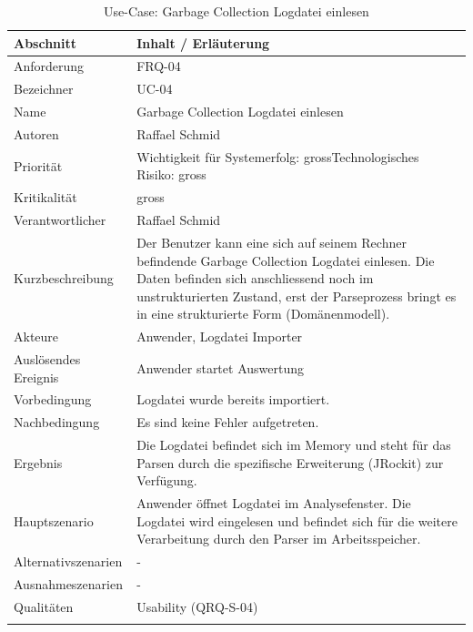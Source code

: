 \begin{longtable}{|p{4cm}|p{10.5cm}|}
\hline
   \textbf{Abschnitt} & \textbf{Inhalt / Erläuterung} \\\hline
   Anforderung & FRQ-04\\\hline
   Bezeichner & UC-04\\\hline
   Name & Garbage Collection Logdatei einlesen\\\hline
   Autoren & Raffael Schmid\\\hline
   Priorität & Wichtigkeit für Systemerfolg: gross\newline Technologisches Risiko: gross\\\hline
   Kritikalität & gross\\\hline
   Verantwortlicher & Raffael Schmid\\\hline
   Kurzbeschreibung & Der Benutzer kann eine sich auf seinem Rechner befindende Garbage Collection Logdatei einlesen. Die Daten befinden sich anschliessend noch im unstrukturierten Zustand, erst der Parseprozess bringt es in eine strukturierte Form (Domänenmodell).\\\hline
   Akteure & Anwender, Logdatei Importer\\\hline
   Auslösendes Ereignis & Anwender startet Auswertung\\\hline
   Vorbedingung & Logdatei wurde bereits importiert.\\\hline
   Nachbedingung & Es sind keine Fehler aufgetreten.\\\hline
   Ergebnis & Die Logdatei befindet sich im Memory und steht für das Parsen durch die spezifische Erweiterung (JRockit) zur Verfügung.\\\hline
   Hauptszenario & Anwender öffnet Logdatei im Analysefenster. Die Logdatei wird eingelesen und befindet sich für die weitere Verarbeitung durch den Parser im Arbeitsspeicher.\\\hline
   Alternativszenarien & -\\\hline
   Ausnahmeszenarien & -\\\hline
   Qualitäten & Usability (QRQ-S-04)\\\hline
\caption{Use-Case: Garbage Collection Logdatei einlesen}
\end{longtable}

